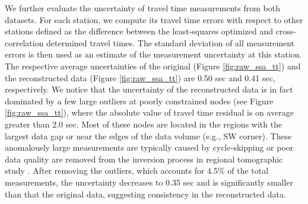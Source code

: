 We further evaluate the uncertainty of travel time measurements from both datasets. For each station, we compute its travel time errors with respect to other stations defined as the difference between the least-squares optimized and cross-correlation determined travel times. The standard deviation of all measurement errors is then used as an estimate of the measurement uncertainty at this station. The respective average uncertainties of the original (Figure \ref{fig:raw_ssa_tt}\color{blue}{(a)}\color{black}{}) and the reconstructed data (Figure \ref{fig:raw_ssa_tt}\color{blue}{(b)}\color{black}{}) are 0.50 sec and 0.41 sec, respectively. We notice that the uncertainty of the reconstructed data is in fact dominated by a few large outliers at poorly constrained nodes (see Figure \ref{fig:raw_ssa_tt}\color{blue}{(b)}\color{black}{}), where the absolute value of travel time residual is on average greater than 2.0 sec. Most of these nodes are located in the regions with the largest data gap or near the edges of the data volume (e.g., SW corner). These anomalously large measurements are typically caused by cycle-skipping or poor data quality are removed from the inversion process in regional tomographic study \cite{chen2017finite}. After removing the outliers, which accounts for 4.5\% of the total measurements, the  uncertainty decreases to 0.35 sec and is significantly smaller than that  the original data, suggesting   consistency in the reconstructed data.

